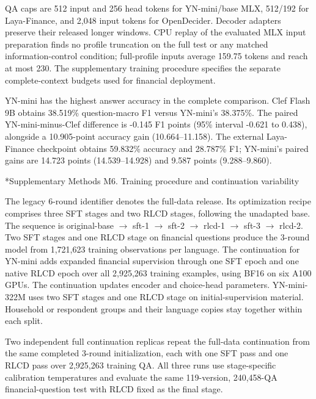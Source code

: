 \documentclass[10pt]{article}
\makeatletter
\renewcommand\section{\@startsection{section}{1}{\z@}{-2.2ex plus -1ex minus -.2ex}{.9ex plus .2ex}{\normalfont\large\mdseries}}
\makeatother
\begin{document}
QA caps are 512 input and 256 head tokens for YN-mini/base MLX, 512/192 for Laya-Finance, and 2,048 input tokens for OpenDecider. Decoder adapters preserve their released longer windows. CPU replay of the evaluated MLX input preparation finds no profile truncation on the full test or any matched information-control condition; full-profile inputs average 159.75 tokens and reach at most 230. The supplementary training procedure specifies the separate complete-context budgets used for financial deployment.

YN-mini has the highest answer accuracy in the complete comparison. Clef Flash 9B obtains 38.519\% question-macro F1 versus YN-mini's 38.375\%. The paired YN-mini-minus-Clef difference is -0.145 F1 points (95\% interval -0.621 to 0.438), alongside a 10.905-point accuracy gain (10.664–11.158). The external Laya-Finance checkpoint obtains 59.832\% accuracy and 28.787\% F1; YN-mini's paired gains are 14.723 points (14.539–14.928) and 9.587 points (9.288–9.860).

\section*{Supplementary Methods M6. Training procedure and continuation variability}

The legacy 6-round identifier denotes the full-data release. Its optimization recipe comprises three SFT stages and two RLCD stages, following the unadapted base. The sequence is original-base \ensuremath{\rightarrow} sft-1 \ensuremath{\rightarrow} sft-2 \ensuremath{\rightarrow} rlcd-1 \ensuremath{\rightarrow} sft-3 \ensuremath{\rightarrow} rlcd-2. Two SFT stages and one RLCD stage on financial questions produce the 3-round model from 1,721,623 training observations per language. The continuation for YN-mini adds expanded financial supervision through one SFT epoch and one native RLCD epoch over all 2,925,263 training examples, using BF16 on six A100 GPUs. The continuation updates encoder and choice-head parameters. YN-mini-322M uses two SFT stages and one RLCD stage on initial-supervision material. Household or respondent groups and their language copies stay together within each split.

Two independent full continuation replicas repeat the full-data continuation from the same completed 3-round initialization, each with one SFT pass and one RLCD pass over 2,925,263 training QA. All three runs use stage-specific calibration temperatures and evaluate the same 119-version, 240,458-QA financial-question test with RLCD fixed as the final stage.
\end{document}
